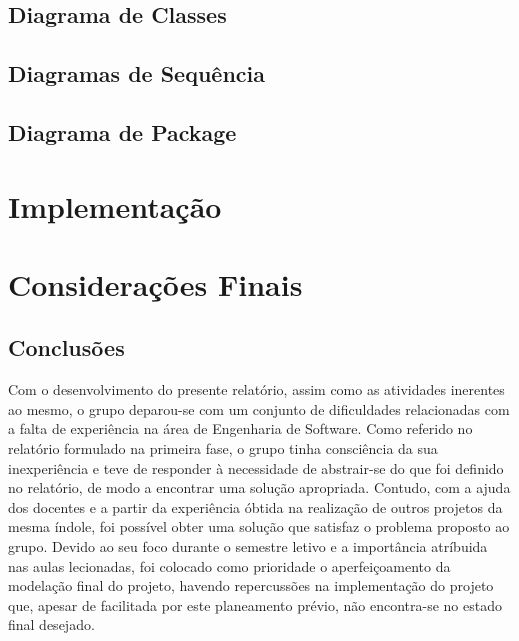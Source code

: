 \documentclass[a4paper,12pt]{scrreprt}
\begin{document}
\section{Diagrama de Classes} \label{sec:diagrama_classe}



\section{Diagramas de Sequência} \label{sec:diagrama_sequencia}


\section{Diagrama de Package} \label{sec:diagrama_package}


\chapter{Implementação} \label{chap:implementacao}



\chapter{Considerações Finais}

\section{Conclusões}

Com o desenvolvimento do presente relatório, assim como as atividades inerentes ao mesmo,
o grupo deparou-se com um conjunto de dificuldades relacionadas com a falta de experiência na área de Engenharia de Software. 
Como referido no relatório formulado na primeira fase, o grupo tinha consciência da sua inexperiência e teve de responder à 
necessidade de abstrair-se do que foi definido no relatório, de modo a encontrar uma solução apropriada.
Contudo, com a ajuda dos docentes e a partir da experiência óbtida na realização de outros projetos da mesma índole, foi 
possível obter uma solução que satisfaz o problema proposto ao grupo. 
Devido ao seu foco durante o semestre letivo e a importância atríbuida nas aulas lecionadas, foi colocado como 
prioridade o aperfeiçoamento da modelação final do projeto, havendo repercussões na implementação do projeto que, apesar de 
facilitada por este planeamento prévio, não encontra-se no estado final desejado. 
\end{document}
